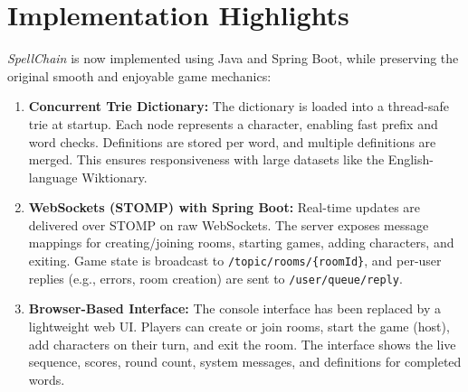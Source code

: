 \documentclass{article}
\begin{document}
\section*{Implementation Highlights}
\textit{SpellChain} is now implemented using Java and Spring Boot, while preserving the original smooth and enjoyable game mechanics:
\begin{enumerate}
    \item \textbf{Concurrent Trie Dictionary:} The dictionary is loaded into a thread-safe trie at startup. Each node represents a character, enabling fast prefix and word checks. Definitions are stored per word, and multiple definitions are merged. This ensures responsiveness with large datasets like the English-language Wiktionary.
    \item \textbf{WebSockets (STOMP) with Spring Boot:} Real-time updates are delivered over STOMP on raw WebSockets. The server exposes message mappings for creating/joining rooms, starting games, adding characters, and exiting. Game state is broadcast to \texttt{/topic/rooms/\{roomId\}}, and per-user replies (e.g., errors, room creation) are sent to \texttt{/user/queue/reply}.
    \item \textbf{Browser-Based Interface:} The console interface has been replaced by a lightweight web UI. Players can create or join rooms, start the game (host), add characters on their turn, and exit the room. The interface shows the live sequence, scores, round count, system messages, and definitions for completed words.
\end{enumerate}
\end{document}
